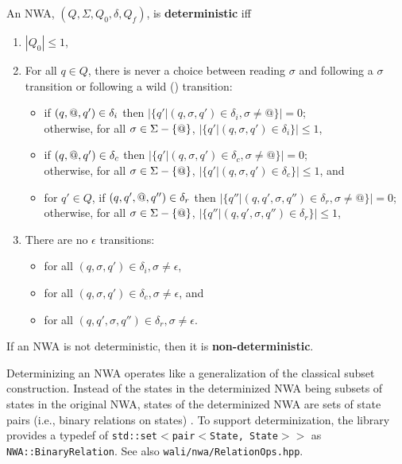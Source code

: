 \begin{definition}
An NWA, $(Q,\Sigma,Q_0,\delta,Q_f)$, is \textbf{deterministic} iff 

\begin{enumerate} 

\item $|Q_0| \leq 1$, 

\item For all $q \in Q$, there is never a choice between reading $\sigma$ and
  following a $\sigma$ transition or following a wild (\wild) transition:
  \begin{itemize}
    \item if $(q,@,q') \in \delta_i$ then $|\{q'|(q,\sigma,q') \in
      \delta_i, {\sigma\neq@}\}| = 0$; \\ otherwise, for all $\sigma \in \Sigma - \{@\}$,
      $|\{q'|(q,\sigma,q') \in \delta_i\}| \leq 1$,

    \item if $(q,@,q') \in \delta_c$ then $ |\{q'|(q,\sigma,q') \in
      \delta_c, {\sigma\neq@}\}| = 0$;\\
      otherwise, for all $\sigma \in \Sigma - \{@\}$,
      $|\{q'|(q,\sigma,q') \in \delta_c\}| \leq 1$, and

    \item for $q' \in Q$, if $(q,q',@,q'') \in \delta_r$ then
      $|\{q''|(q,q',\sigma,q'') \in \delta_r, {\sigma\neq@}\}| = 0$; \\
      otherwise, for all
      $\sigma \in \Sigma - \{@\}$, $|\{q''|(q,q',\sigma,q'') \in \delta_r\}|
      \leq 1$,
  \end{itemize}
\item There are no $\epsilon$ transitions:
 \begin{itemize}
   \item for all $(q,\sigma,q') \in \delta_i, \sigma \neq \epsilon$,
   \item for all $(q,\sigma,q') \in \delta_c, \sigma \neq \epsilon$, and
   \item for all $(q,q',\sigma,q'') \in \delta_r, \sigma \neq \epsilon$.
 \end{itemize}
\end{enumerate}
If an NWA is not deterministic, then it is \textbf{non-deterministic}.
\end{definition}

Determinizing an NWA operates like a
generalization of the classical subset construction.  Instead of the states
in the determinized NWA being subsets of states in the original NWA, states of the
determinized NWA are sets of state pairs (i.e., binary relations on states)
\cite{JACM:AM2009}.  To support determinization, the library provides a
typedef of \texttt{std::set$<$pair$<$State, State$>>$} as 
\texttt{NWA::BinaryRelation}. See also \texttt{wali/nwa/RelationOps.hpp}.

